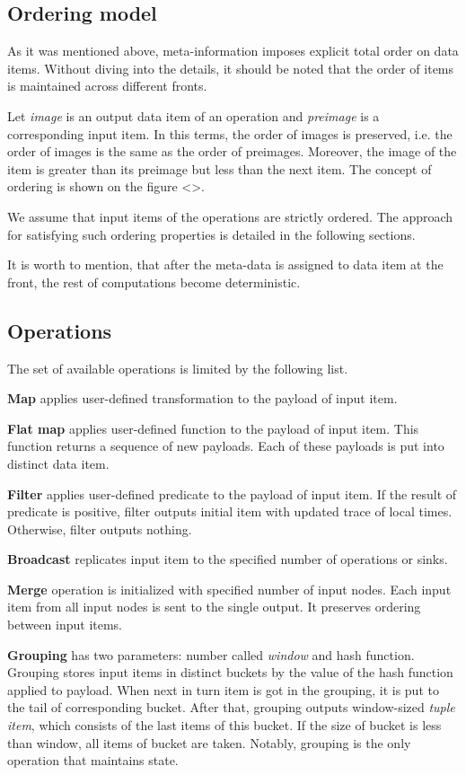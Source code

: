 \subsection{Ordering model}

As it was mentioned above, meta-information imposes explicit total order on data items. Without diving into the details, it should be noted that the order of items is maintained across different fronts.

Let {\it image} is an output data item of an operation and {\it preimage} is a corresponding input item. In this terms, the order of images is preserved, i.e. the order of images is the same as the order of preimages. Moreover, the image of the item is greater than its preimage but less than the next item. The concept of ordering is shown on the figure <>.

We assume that input items of the operations are strictly ordered. The approach for satisfying such ordering properties is detailed in the following sections.

It is worth to mention, that after the meta-data is assigned to data item at the front, the rest of computations become deterministic.

\subsection{Operations}

The set of available operations is limited by the following list.

{\bf Map} applies user-defined transformation to the payload of input item. 

{\bf Flat map} applies user-defined function to the payload of input item. This function returns a sequence of new payloads. Each of these payloads is put into distinct data item. 

{\bf Filter} applies user-defined predicate to the payload of input item. If the result of predicate is positive, filter outputs initial item with updated trace of local times. Otherwise, filter outputs nothing.

{\bf Broadcast} replicates input item to the specified number of operations or sinks. 

{\bf Merge} operation is initialized with specified number of input nodes. Each input item from all input nodes is sent to the single output. It preserves ordering between input items.

{\bf Grouping} has two parameters: number called {\it window} and hash function. Grouping stores input items in distinct buckets by the value of the hash function applied to payload. When next in turn item is got in the grouping, it is put to the tail of corresponding bucket. After that, grouping outputs window-sized {\it tuple item}, which consists of the last items of this bucket. If the size of bucket is less than window, all items of bucket are taken. Notably, grouping is the only operation that maintains state.
	
